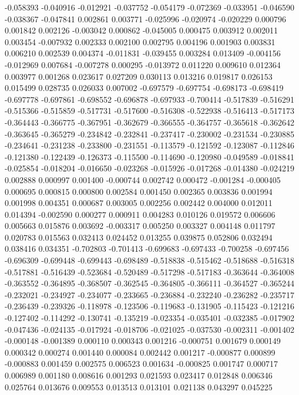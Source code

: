 -0.058393
-0.040916
-0.012921
-0.037752
-0.054179
-0.072369
-0.033951
-0.046590
-0.038367
-0.047841
0.002861
0.003771
-0.025996
-0.020974
-0.020229
0.000796
0.001842
0.002126
-0.003042
0.000862
-0.045005
0.000475
0.003912
0.002011
0.003454
-0.007932
0.002333
0.002100
0.002795
0.004196
0.001903
0.003831
0.006210
0.002539
0.004374
-0.011831
-0.039455
0.003284
0.013409
-0.004156
-0.012969
0.007684
-0.007278
0.000295
-0.013972
0.011220
0.009610
0.012364
0.003977
0.001268
0.023617
0.027209
0.030113
0.013216
0.019817
0.026153
0.015499
0.028735
0.026033
0.007002
-0.697579
-0.697754
-0.698173
-0.698419
-0.697778
-0.697861
-0.698552
-0.696878
-0.697933
-0.700414
-0.517839
-0.516291
-0.515366
-0.515859
-0.517731
-0.517600
-0.516308
-0.522938
-0.516413
-0.517173
-0.364443
-0.366775
-0.367951
-0.362679
-0.366555
-0.364757
-0.365618
-0.362642
-0.363645
-0.365279
-0.234842
-0.232841
-0.237417
-0.230002
-0.231534
-0.230885
-0.234641
-0.231238
-0.233800
-0.231551
-0.113579
-0.121592
-0.123087
-0.112846
-0.121380
-0.122439
-0.126373
-0.115500
-0.114690
-0.120980
-0.049589
-0.018841
-0.025854
-0.018204
-0.016650
-0.023268
-0.015926
-0.017268
-0.014380
-0.024219
0.002888
0.000997
0.001400
-0.000744
0.002742
0.000472
-0.001284
-0.000405
0.000695
0.000815
0.000800
0.002584
0.001450
0.002365
0.003836
0.001994
0.001998
0.004351
0.000687
0.003005
0.002256
0.002442
0.004000
0.012011
0.014394
-0.002590
0.000277
0.000911
0.004283
0.010126
0.019572
0.006606
0.005663
0.015876
0.003692
-0.003317
0.005250
0.003327
0.004148
0.011797
0.020783
0.015563
0.032413
0.024452
0.013255
0.039875
0.052806
0.032494
0.038416
0.034351
-0.702803
-0.701413
-0.699683
-0.697433
-0.700258
-0.697456
-0.696309
-0.699448
-0.699443
-0.698489
-0.518838
-0.515462
-0.518688
-0.516318
-0.517881
-0.516439
-0.523684
-0.520489
-0.517298
-0.517183
-0.363644
-0.364008
-0.363552
-0.364895
-0.368507
-0.362545
-0.364805
-0.366111
-0.364527
-0.365244
-0.232021
-0.234927
-0.234077
-0.233665
-0.236884
-0.232240
-0.236282
-0.235717
-0.236439
-0.239326
-0.118978
-0.123506
-0.119683
-0.131905
-0.115423
-0.121216
-0.127402
-0.114292
-0.130741
-0.135219
-0.023354
-0.035401
-0.032385
-0.017902
-0.047436
-0.024135
-0.017924
-0.018706
-0.021025
-0.037530
-0.002311
-0.001402
-0.000148
-0.001389
0.000110
0.000343
0.001216
-0.000751
0.001679
0.000149
0.000342
0.000274
0.001440
0.000084
0.002442
0.001217
-0.000877
0.000899
-0.000883
0.001459
0.002575
0.006523
0.001634
-0.000825
0.001747
0.000717
0.006989
0.001180
0.008616
0.001293
0.021593
0.023417
0.012848
0.006346
0.025764
0.013676
0.009553
0.013513
0.013101
0.021138
0.043297
0.045225

